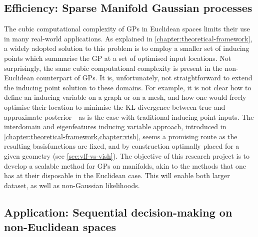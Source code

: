 \subsection{Efficiency: Sparse Manifold Gaussian processes}

The cubic computational complexity of GPs in Euclidean spaces limits their use in many real-world applications. As explained in \cref{chapter:theoretical-framework}, a widely adopted solution to this problem is to employ a smaller set of inducing points which summarise the GP at a set of optimised input locations. Not surprisingly, the same cubic computational complexity is present in the non-Euclidean counterpart of GPs. It is, unfortunately, not straightforward to extend the inducing point solution to these domains. For example, it is not clear how to define an inducing variable on a graph or on a mesh, and how one would freely optimise their location to minimise the KL divergence between true and approximate posterior---as is the case with traditional inducing point inputs. The interdomain and eigenfeatures inducing variable approach, introduced in \cref{chapter:theoretical-framework,chapter:vish}, seems a promising route as the resulting basisfunctions are fixed, and by construction optimally placed for a given geometry (see \cref{sec:vff-vs-vish}). The objective of this research project is to develop a scalable method for GPs on manifolds, akin to the methods that one has at their disposable in the Euclidean case. This will enable both larger dataset, as well as non-Gaussian likelihoods.

\subsection{Application: Sequential decision-making on non-Euclidean spaces}

